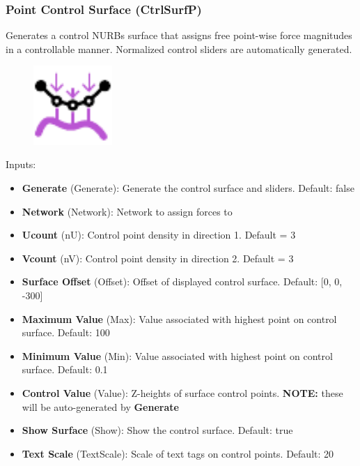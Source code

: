 \subsubsection{Point Control Surface (CtrlSurfP)} \label{CtrlSurfP}
Generates a control NURBs surface that assigns free point-wise force magnitudes in a controllable manner. Normalized control sliders are automatically generated.

\begin{figure}[h]
    \centering
    \includegraphics[width=3cm]{Figures/SurfP}
\end{figure}

Inputs:
\begin{itemize}
    \setlength\itemsep{0.05em}
    \item \textbf{Generate} (Generate): Generate the control surface and sliders. {\color{gray} Default: false}
    \item \textbf{Network} (Network): Network to assign forces to
    \item \textbf{Ucount} (nU): Control point density in direction 1. {\color{gray} Default = 3}
    \item \textbf{Vcount} (nV): Control point density in direction 2. {\color{gray} Default = 3}
    \item \textbf{Surface Offset} (Offset): Offset of displayed control surface. {\color{gray} Default: [0, 0, -300]}
    \item \textbf{Maximum Value} (Max): Value associated with highest point on control surface. {\color{gray} Default: 100}
    \item \textbf{Minimum Value} (Min): Value associated with highest point on control surface. {\color{gray} Default: 0.1}
    \item \textbf{Control Value} (Value): Z-heights of surface control points. {\color{kpink} \textbf{NOTE:} these will be auto-generated by \textbf{Generate}}
    \item \textbf{Show Surface} (Show): Show the control surface. {\color{gray} Default: true}
    \item \textbf{Text Scale} (TextScale): Scale of text tags on control points. {\color{gray} Default: 20}
\end{itemize}

